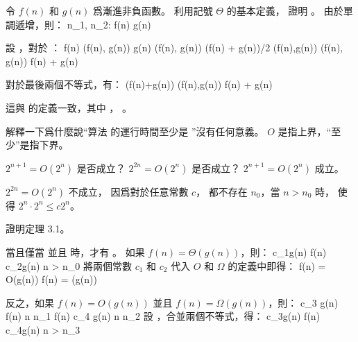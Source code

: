\startsection[
  title={Asymptotic notation: formal definitions},
]

\startEXERCISE
令 $f(n)$ 和 $g(n)$ 爲漸進非負函數。
利用記號 $\Theta$ 的基本定義，
證明 。
\stopEXERCISE
\startANSWER
由於單調遞增，則：
\startformula\startalign[n=3]
\NC \exists n_1, n_2: \NC f(n)  \NC \quad{} \NR
\NC                   \NC g(n)  \NC \quad{} \NR
\stopalign\stopformula

設 ，對於 ：
\startformula\startalign
\NC f(n) \NC \leq \max(f(n), g(n)) \NR
\NC g(n) \NC \leq \max(f(n), g(n)) \NR
\NC (f(n) + g(n))/2 \NC \leq \max(f(n),g(n)) \NR
\NC \max(f(n), g(n)) \NC \leq f(n) + g(n) \NR
\stopalign\stopformula

對於最後兩個不等式，有：
 \leq {}(f(n)+g(n)) \leq \max(f(n),g(n)) \leq f(n) + g(n)
\stopformula

這與  的定義一致，其中 ， 。
\stopANSWER

\startEXERCISE
解釋一下爲什麼說“算法  的運行時間至少是 ”沒有任何意義。
\stopEXERCISE
\startANSWER
$O$ 是指上界，“至少”是指下界。
\stopANSWER

\startEXERCISE
$2^{n+1} = O(2^n)$ 是否成立？
$2^{2n} = O(2^n)$ 是否成立？
\stopEXERCISE
\startANSWER
$2^{n+1} = O(2^n)$ 成立。

$2^{2n} = O(2^n)$ 不成立，
因爲對於任意常數 $c$，
都不存在 $n_0$，當 $n>n_0$ 時，
使得 $2^n \cdot 2^n \leq c 2^n$。
\stopANSWER

\startEXERCISE
證明定理 3.1。

當且僅當  並且  時，才有 。
\stopEXERCISE
\startANSWER
如果 $f(n) = \Theta(g(n))$，則：
 \le c_1g(n) \le f(n) \le c_2g(n) \quad {} n > n_0
\stopformula
將兩個常數 $c_1$ 和 $c_2$ 代入 $O$ 和 $\Omega$ 的定義中即得：
\startformula\startalign
\NC f(n) \NC = O(g(n)) \NR
\NC f(n) \NC = \Omega(g(n)) \NR
\stopalign\stopformula

反之，如果 $f(n) = O(g(n))$ 並且 $f(n) = \Omega(g(n))$，則：
\startformula\startalign
{} \le c_3 g(n) \le f(n) \NC \quad {} n \ge n_1 \NR
{} \le f(n) \le c_4 g(n) \NC \quad {} n \ge n_2 \NR
\stopalign\stopformula
設 ，合並兩個不等式，得：
 \leq c_3g(n) \leq f(n) \leq c_4g(n) \quad {} n > n_3
\stopformula
\stopANSWER

